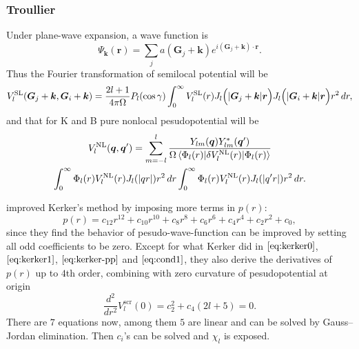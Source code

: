 
\subsubsection{Troullier}
\label{sssec:troullier}

Under plane-wave expansion, a wave function is
\begin{equation}
	\Psi_{\bm{k}} (\bm{r}) = \sum_{j}
	a (\bm{G}_j + \bm{k}) e^{i (\bm{G}_j + \bm{k}) \cdot \bm{r}}.
\end{equation}
Thus the Fourier transformation of semilocal potential will be
\begin{equation}
	V_l^\text{SL} (\bm{G}_j + \bm{k}, \bm{G}_i + \bm{k})
	= \frac{ 2l+1 }{ 4\pi \Omega } P_l (\cos \gamma)
	\int_{0}^{\infty} V_l^\text{SL} (r)
	J_l \Big(\abs{\bm{G}_j + \bm{k}} \bm{r} \Big)
	J_l \Big(\abs{\bm{G}_i + \bm{k}} \bm{r} \Big) r^2 \, dr,
\end{equation}
and that for K and B pure nonlocal pesudopotential will be
\begin{multline}
	V_l^\text{NL} (\bm{q}, \bm{q}')
	= \sum_{m = -l}^{l}
	\frac{ Y_{lm} (\bm{q}) Y_{lm}^\ast (\bm{q}') }{ \Omega
		\braket{ \Phi_{l} (r) | \delta V_l^\text{NL} (r) | \Phi_{l} (r) }} \\
	\int_{0}^{\infty} \Phi_{l} (r) V_l^\text{NL} (r) J_l (\abs{q r}) r^2 \, dr
	\int_{0}^{\infty} \Phi_{l} (r) V_l^\text{NL} (r) J_l (\abs{q' r}) r^2 \, dr.
\end{multline}







\citeauthor{Troullier:1991ey} improved Kerker's method \cite{Kerker:1980cs} by imposing more
terms in $p(r)$:
\begin{equation}
	p(r) = c_{12} r^{12} + c_{10} r^{10} + c_8 r^8 + c_6 r^6 + c_4 r^4 + c_2 r^2 + c_0,
\end{equation}
since they find the behavior of pesudo-wave-function can be improved by setting all odd coefficients
to be zero. Except for what Kerker did in $\eqref{eq:kerker0}$, $\eqref{eq:kerker1}$,
$\eqref{eq:kerker-pp}$ and $\eqref{eq:cond1}$,
they also derive the derivatives of $p(r)$ up to $4$th order,
combining with zero curvature of pesudopotential at origin
\begin{equation}
	\frac{ d^2 }{ d r^2 } V_l^\text{scr} (0) = c_2^2 + c_4 (2 l + 5) = 0.
\end{equation}
There are $7$ equations now, among them $5$ are linear and can be solved by Gauss--Jordan
elimination.
Then $c_i$'s can be solved and $\chi_l$ is exposed.

